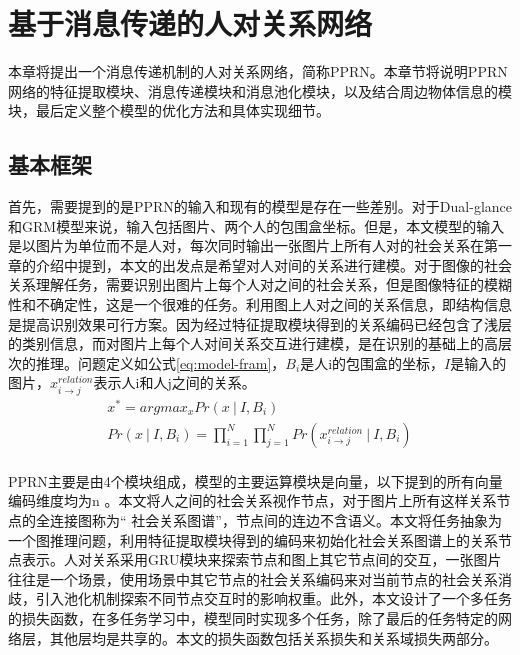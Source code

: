
\chapter{基于消息传递的人对关系网络}
\label{ch:model}

本章将提出一个消息传递机制的人对关系网络，简称PPRN。本章节将说明PPRN网络的特征提取模块、消息传递模块和消息池化模块，以及结合周边物体信息的模块，最后定义整个模型的优化方法和具体实现细节。


\section{基本框架}
首先，需要提到的是PPRN的输入和现有的模型是存在一些差别。对于Dual-glance和GRM模型来说，输入包括图片、两个人的包围盒坐标。但是，本文模型的输入是以图片为单位而不是人对，每次同时输出一张图片上所有人对的社会关系在第一章的介绍中提到，本文的出发点是希望对人对间的关系进行建模。对于图像的社会关系理解任务，需要识别出图片上每个人对之间的社会关系，但是图像特征的模糊性和不确定性，这是一个很难的任务。利用图上人对之间的关系信息，即结构信息是提高识别效果可行方案。因为经过特征提取模块得到的关系编码已经包含了浅层的类别信息，而对图片上每个人对间关系交互进行建模，是在识别的基础上的高层次的推理。问题定义如公式\ref{eq:model-fram}，$B_{i}$是人i的包围盒的坐标，$I$是输入的图片，$x_{i \rightarrow j}^{relation}$表示人i和人j之间的关系。
\begin{equation} \label{eq:model-fram}
\begin{split}
    x^{*} = argmax_{x}Pr(x~|~I,B_{i}) \\
    Pr(x~|~I,B_{i}) = \prod_{i=1}^{N}\prod_{j=1}^{N}Pr(x_{i \rightarrow j}^{relation}~|~I,B_{i}) \\
\end{split}
\end{equation}

PPRN主要是由4个模块组成，模型的主要运算模块是向量，以下提到的所有向量编码维度均为n 。本文将人之间的社会关系视作节点，对于图片上所有这样关系节点的全连接图称为`` 社会关系图谱''，节点间的连边不含语义。本文将任务抽象为一个图推理问题，利用特征提取模块得到的编码来初始化社会关系图谱上的关系节点表示。人对关系采用GRU模块来探索节点和图上其它节点间的交互，一张图片往往是一个场景，使用场景中其它节点的社会关系编码来对当前节点的社会关系消歧，引入池化机制探索不同节点交互时的影响权重。此外，本文设计了一个多任务的损失函数，在多任务学习中，模型同时实现多个任务，除了最后的任务特定的网络层，其他层均是共享的。本文的损失函数包括关系损失和关系域损失两部分。

